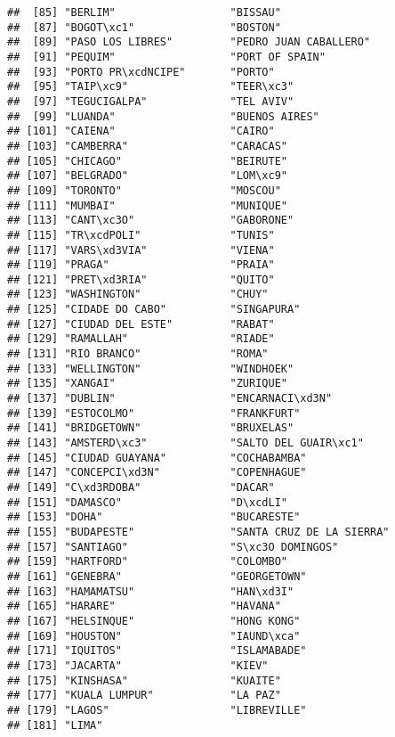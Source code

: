 \documentclass[
]{article}
\begin{document}
\begin{verbatim}
##  [85] "BERLIM"                  "BISSAU"                 
##  [87] "BOGOT\xc1"               "BOSTON"                 
##  [89] "PASO LOS LIBRES"         "PEDRO JUAN CABALLERO"   
##  [91] "PEQUIM"                  "PORT OF SPAIN"          
##  [93] "PORTO PR\xcdNCIPE"       "PORTO"                  
##  [95] "TAIP\xc9"                "TEER\xc3"               
##  [97] "TEGUCIGALPA"             "TEL AVIV"               
##  [99] "LUANDA"                  "BUENOS AIRES"           
## [101] "CAIENA"                  "CAIRO"                  
## [103] "CAMBERRA"                "CARACAS"                
## [105] "CHICAGO"                 "BEIRUTE"                
## [107] "BELGRADO"                "LOM\xc9"                
## [109] "TORONTO"                 "MOSCOU"                 
## [111] "MUMBAI"                  "MUNIQUE"                
## [113] "CANT\xc3O"               "GABORONE"               
## [115] "TR\xcdPOLI"              "TUNIS"                  
## [117] "VARS\xd3VIA"             "VIENA"                  
## [119] "PRAGA"                   "PRAIA"                  
## [121] "PRET\xd3RIA"             "QUITO"                  
## [123] "WASHINGTON"              "CHUY"                   
## [125] "CIDADE DO CABO"          "SINGAPURA"              
## [127] "CIUDAD DEL ESTE"         "RABAT"                  
## [129] "RAMALLAH"                "RIADE"                  
## [131] "RIO BRANCO"              "ROMA"                   
## [133] "WELLINGTON"              "WINDHOEK"               
## [135] "XANGAI"                  "ZURIQUE"                
## [137] "DUBLIN"                  "ENCARNACI\xd3N"         
## [139] "ESTOCOLMO"               "FRANKFURT"              
## [141] "BRIDGETOWN"              "BRUXELAS"               
## [143] "AMSTERD\xc3"             "SALTO DEL GUAIR\xc1"    
## [145] "CIUDAD GUAYANA"          "COCHABAMBA"             
## [147] "CONCEPCI\xd3N"           "COPENHAGUE"             
## [149] "C\xd3RDOBA"              "DACAR"                  
## [151] "DAMASCO"                 "D\xcdLI"                
## [153] "DOHA"                    "BUCARESTE"              
## [155] "BUDAPESTE"               "SANTA CRUZ DE LA SIERRA"
## [157] "SANTIAGO"                "S\xc3O DOMINGOS"        
## [159] "HARTFORD"                "COLOMBO"                
## [161] "GENEBRA"                 "GEORGETOWN"             
## [163] "HAMAMATSU"               "HAN\xd3I"               
## [165] "HARARE"                  "HAVANA"                 
## [167] "HELSINQUE"               "HONG KONG"              
## [169] "HOUSTON"                 "IAUND\xca"              
## [171] "IQUITOS"                 "ISLAMABADE"             
## [173] "JACARTA"                 "KIEV"                   
## [175] "KINSHASA"                "KUAITE"                 
## [177] "KUALA LUMPUR"            "LA PAZ"                 
## [179] "LAGOS"                   "LIBREVILLE"             
## [181] "LIMA"
\end{verbatim}
\end{document}
